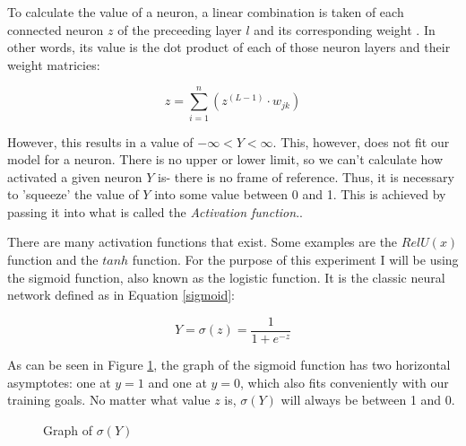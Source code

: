 \documentclass[12pt]{article}
\begin{document}
        To calculate the value of a neuron, a linear combination is taken of each connected neuron $z$ of the preceeding layer $l$ and its corresponding weight \textcite{sharma2017}. In other words, its value is the dot product of each of those neuron layers and their weight matricies:

        \begin{equation} \label{forwardpropequation}
            z = \sum_{i=1}^{n}(z^{(L-1)} \cdot  w_{jk})
        \end{equation}
        
        However, this results in a value of \begin{math} -\infty < Y < \infty \end{math}. This, however, does not fit our model for a neuron. There is no upper or lower limit, so we can't calculate how activated a given neuron \(Y\) is- there is no frame of reference. Thus, it is necessary to 'squeeze' the value of \(Y\) into some value between 0 and 1. This is achieved by passing it into what is called the \textit{Activation function}.\textcite{sharma2017}.

        There are many activation functions that exist. Some examples are the \(RelU(x)\) function and the \(tanh\) function. For the purpose of this experiment I will be using the sigmoid function, also known as the logistic function. It is the classic neural network \textcite{DeepLearningCh2} defined as in Equation \ref{sigmoid}:

        \begin{equation} \label{sigmoid} 
            Y = \sigma(z) = \frac{1}{1 + e ^ {-z}}
        \end{equation}
        
        
        As can be seen in Figure \ref{sigmoidgraph}, the graph of the sigmoid function has two horizontal asymptotes: one at \(y = 1\) and one at \(y = 0\), which also fits conveniently with our training goals. No matter what value $z$ is, \(\sigma(Y)\) will always be between 1 and 0.

        \begin{figure}[h]
            \centering
            \caption{Graph of $\sigma(Y)$} \label{sigmoidgraph}
        \end{figure}
\end{document}
